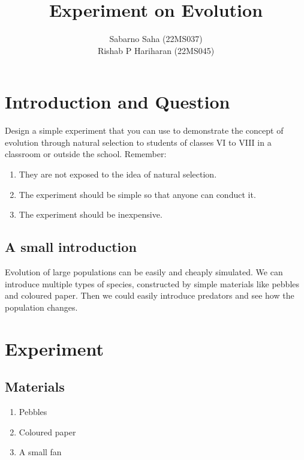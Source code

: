 \documentclass{scrartcl}
\title{Experiment on Evolution}
\author{Sabarno Saha (22MS037)\\Rishab P Hariharan (22MS045)}
\date{}
\begin{document}
\maketitle
\tableofcontents
\newpage

\section{Introduction and Question}
\begin{question*}
   Design a simple experiment that you can use to demonstrate the concept of evolution through
    natural selection to students of classes VI to VIII in a classroom or outside the school.
Remember: 

    \begin{enumerate}
        \item  They are not exposed to the idea of natural selection.
        \item  The experiment should be simple so that anyone can conduct it.
        \item The experiment should be inexpensive.
    \end{enumerate}
\end{question*}
\subsection{A small introduction}
Evolution of large populations can be easily and cheaply simulated. We can introduce multiple types of species, constructed by simple materials like pebbles and coloured paper. Then we could easily introduce predators and see how the population changes.
\section{Experiment}
\subsection{Materials}
\begin{enumerate}
    \item Pebbles
    \item Coloured paper 
    \item A small fan
\end{enumerate}
\end{document}
